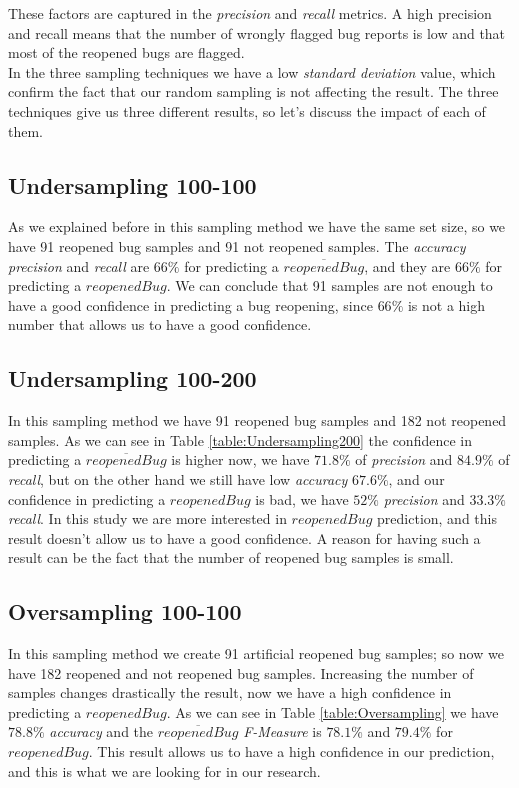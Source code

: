 \documentclass[sigconf,review]{acmart}
\begin{document}
  These factors are captured in the \emph{precision} and \emph{recall} metrics. A high precision and recall means that the number of wrongly flagged bug reports is low and that most of the reopened bugs are flagged.\cite{Shihab:wcre}\\

  In the three sampling techniques we have a low \emph{standard deviation} value, which confirm the fact that our random sampling is not affecting the result. The three techniques give us three different results, so let's discuss the impact of each of them.

	
	\subsection {Undersampling 100-100} As we explained before in this sampling method we have the same set size, so we have 91 reopened bug samples and 91 not reopened samples. The \emph{accuracy precision} and \emph{recall} are $66\%$ for predicting a $\overline{reopened Bug}$, and they are $66\%$ for predicting a $reopenedBug$. We can conclude that 91 samples are not enough to have a good confidence in predicting a bug reopening, since $66\%$ is not a high number that allows us to have a good confidence. 
	
	
	\subsection {Undersampling 100-200} In this sampling method we have 91 reopened bug samples and 182 not reopened samples. As we can see in Table \ref{table:Undersampling200} the confidence in predicting a $\overline{reopened Bug}$ is higher now, we have $71.8\%$ of \emph{precision} and $84.9\%$ of \emph{recall}, but on the other hand we still have low \emph{accuracy} $67.6\%$, and our confidence in predicting a $reopenedBug$ is bad, we have $52\%$  \emph{precision} and $33.3\%$ \emph{recall}. In this study we are more interested in $reopenedBug$ prediction, and this result doesn't allow us to have a good confidence. A reason for having such a result can be the fact that the number of reopened bug samples is small.
	
	\subsection{Oversampling 100-100} In this sampling method we create 91 artificial reopened bug samples; so now we have 182 reopened and not reopened bug samples. Increasing the number of samples changes drastically the result, now we have a high confidence in predicting a $reopenedBug$.
	As we can see in Table \ref{table:Oversampling} we have $78.8\%$ \emph{accuracy} and the $\overline{reopened Bug}$ \emph{F-Measure} is $78.1\%$ and $79.4\%$ for ${reopened Bug}$. This result allows us to have a high confidence in our prediction, and this is what we are looking for in our research.
\end{document}

